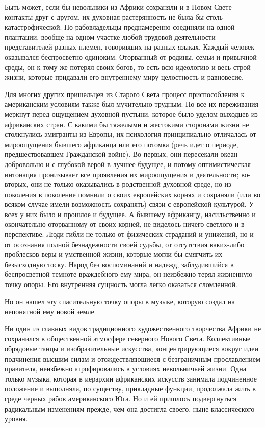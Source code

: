 Быть  может,  если  бы  невольники  из  Африки  сохраняли  и  в  Новом
Свете контакты  друг с  другом, их духовная  растерянность не  была бы
столь  катастрофической. Но  рабовладельцы преднамеренно  соединяли на
одной плантации,  вообще на одном участке  любой трудовой деятельности
представителей  разных племен,  говоривших  на  разных языках.  Каждый
человек оказывался беспросветно одиноким.  Оторванный от родины, семьи
и  привычной среды,  он к  тому же  потерял своих  богов, то  есть всю
идеологию и весь  строй жизни, которые придавали  его внутреннему миру
целостность и равновесие.

Для многих  других пришельцев из Старого  Света процесс приспособления
к  американским  условиям также  был  мучительно  трудным. Но  все  их
переживания  меркнут перед  ощущением духовной  пустыни, которое  было
уделом выходцев из африканских стран. С какими бы тяжелыми и жестокими
сторонами  жизни не  столкнулись  эмигранты из  Европы, их  психология
принципиально  отличалась от  мироощущения бывшего  африканца или  его
потомка  (речь идет  о периоде,  предшествовавшем Гражданской  войне).
Во-первых,  они пересекали  океан  добровольно и  с  глубокой верой  в
лучшее  будущее, и  потому оптимистическая  интонация пронизывает  все
проявления их  мироощущения и  деятельности; во-вторых, они  не только
оказывались в родственной духовной среде,  но из поколения в поколение
помнили о своих  европейских корнях и сохраняли (или  во всяком случае
имели возможность сохранять)  связи с европейской культурой.  У всех у
них было  и прошлое  и будущее. А  бывшему африканцу,  насильственно и
окончательно оторванному от своих  корней, не виделось ничего светлого
и  в перспективе.  Люди  гибли  не только  от  физических страданий  и
унижений,  но и  от осознания  полной безнадежности  своей судьбы,  от
отсутствия  каких-либо проблесков  веры  и  умственной жизни,  которые
могли  бы смягчить  их  безысходную тоску.  Народ  без воспоминаний  и
надежд, заблудившийся в беспросветной темноте враждебного ему мира, он
неизбежно терял  жизненную точку опоры. Его  внутренняя сущность могла
легко оказаться сломленной.

Но он нашел  эту спасительную точку опоры в музыке,  которую создал на
непонятной ему новой земле.

Ни  один из  главных  видов  традиционного художественного  творчества
Африки  не  сохранился  в   общественной  атмосфере  северного  Нового
Света.  Коллективные  обрядовые  танцы  и  изобразительные  искусства,
концентрирующиеся    вокруг   идеи    подчинения   высшим    силам   и
отождествляющиеся  с безграничным  прославлением правителя,  неизбежно
атрофировались  в условиях  невольничьей  жизни.  Одна только  музыка,
которая в иерархии африканских искусств занимала подчиненное положение
и выполняла, по существу, прикладные  функции, продолжала жить в среде
черных  рабов  американского  Юга.  Но  и  ей  пришлось  подвергнуться
радикальным  изменениям   прежде,  чем   она  достигла   своего,  ныне
классического уровня.

